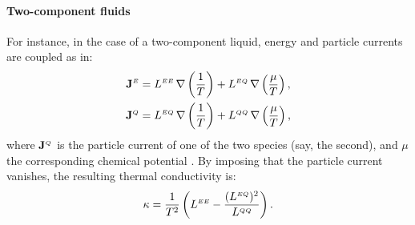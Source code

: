 \paragraph{Two-component fluids}
For instance, in the case of a two-component liquid, energy and particle currents are coupled as in:
\begin{equation}
  \begin{aligned}
    \mathbf{J}^\smallE &= L^{\smallE\smallE}\,  \nabla \left (\frac{1}{T} \right ) + L^{\smallE\smallQ} \, \nabla \left (\frac{\mu}{T} \right ), \\
    \mathbf{J}^{\smallQ} &= L^{\smallE\smallQ} \, \nabla \left (\frac{1}{T} \right ) + L^{\smallQ\smallQ} \, \nabla \left (\frac{\mu}{T} \right ), \label{eq:two-comp-constitutive}
  \end{aligned}
\end{equation}
where $\mathbf{J}^{{\scriptscriptstyle Q}}$ is the particle current of one of the two species (say, the second), and $\mu$ the corresponding chemical potential \cite{Sindzingre1990}. By imposing that the particle current vanishes, the resulting thermal conductivity is:
\begin{equation}
  \kappa=\frac{1}{T^2}
  \left( L^{\smallE\smallE} - \frac{(L^{\smallE\smallQ})^2}{L^{\smallQ\smallQ}} \right). \label{eq:two-comp-kappa}
\end{equation}


\bigskip
\bigskip
{}